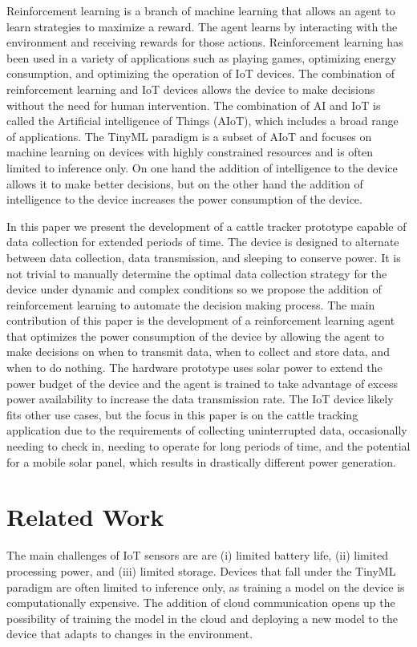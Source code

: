 \documentclass[10pt]{cai}
\begin{document}
Reinforcement learning is a branch of machine learning that allows an agent to learn strategies to maximize a reward.
The agent learns by interacting with the environment and receiving rewards for those actions.
Reinforcement learning has been used in a variety of applications such as playing games, optimizing energy consumption, and optimizing the operation of IoT devices.
The combination of reinforcement learning and IoT devices allows the device to make decisions without the need for human intervention.
The combination of AI and IoT is called the Artificial intelligence of Things (AIoT)\cite{yamsaniIoTBasedLivestockMonitoring2024}, which includes a broad range of applications.
The TinyML paradigm is a subset of AIoT and focuses on machine learning on devices with highly constrained resources and is often limited to inference only\cite{rayReviewTinyMLStateoftheart2022}.
On one hand the addition of intelligence to the device allows it to make better decisions, but on the other hand the addition of intelligence to the device increases the power consumption of the device.

In this paper we present the development of a cattle tracker prototype capable of data collection for extended periods of time.
The device is designed to alternate between data collection, data transmission, and sleeping to conserve power.
It is not trivial to manually determine the optimal data collection strategy for the device under dynamic and complex conditions \cite{suttonReinforcementLearningIntroduction2020} so we propose the addition of reinforcement learning to automate the decision making process.
The main contribution of this paper is the development of a reinforcement learning agent that optimizes the power consumption of the device by allowing the agent to make decisions on when to transmit data, when to collect and store data, and when to do nothing.
The hardware prototype uses solar power to extend the power budget of the device and the agent is trained to take advantage of excess power availability to increase the data transmission rate.
The IoT device likely fits other use cases, but the focus in this paper is on the cattle tracking application due to the requirements of collecting uninterrupted data, occasionally needing to check in, needing to operate for long periods of time, and the potential for a mobile solar panel, which results in drastically different power generation.

\section{Related Work}
The main challenges of IoT sensors are \cite{chenDeepReinforcementLearning2021} are (i) limited battery life, (ii) limited processing power, and (iii) limited storage.
Devices that fall under the TinyML paradigm are often limited to inference only, as training a model on the device is computationally expensive.
The addition of cloud communication opens up the possibility of training the model in the cloud and deploying a new model to the device that adapts to changes in the environment.
\end{document}
